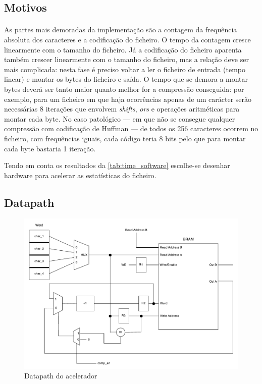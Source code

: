 \subsection{Motivos}
  \paragraph{} As partes mais demoradas da implementação são a contagem da frequência absoluta dos caracteres e a codificação do ficheiro. O tempo da contagem cresce linearmente com o tamanho do ficheiro. Já a codificação do ficheiro aparenta também crescer linearmente com o tamanho do ficheiro, mas a relação deve ser mais complicada: nesta fase é preciso voltar a ler o ficheiro de entrada (tempo linear) e montar os bytes do ficheiro e saída. O tempo que se demora a montar bytes deverá ser tanto maior quanto melhor for a compressão conseguida: por exemplo, para um ficheiro em que haja ocorrências apenas de um carácter serão necessárias 8 iterações que envolvem \textit{shifts}, \textit{ors} e operações aritméticas para montar cada byte. No caso patológico --- em que não se consegue qualquer compressão com codificação de Huffman --- de todos os 256 caracteres ocorrem no ficheiro, com frequências iguais, cada código teria 8 bits pelo que para montar cada byte bastaria 1 iteração.

  Tendo em conta os resultados da \autoref{tab:time_software} escolhe-se desenhar hardware para acelerar as estatísticas do ficheiro.

  \subsection{Datapath}

  \begin{figure}[H]
    \centering
    \includegraphics[width=1.0\textwidth]{img/hw_datapath}
    \caption{Datapath do acelerador}
    \label{fig:hw_datapath}
  \end{figure}

